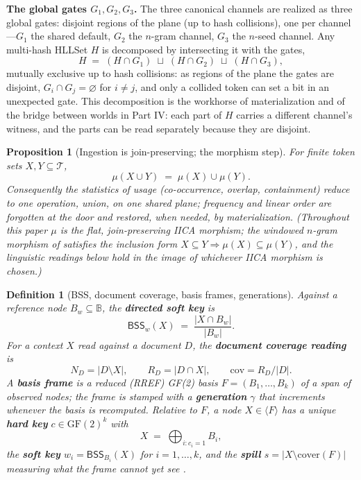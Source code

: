 \documentclass[11pt,a4paper]{article}
\newtheorem{definition}[principle]{Definition}
\newtheorem{proposition}[principle]{Proposition}
\theoremstyle{remark}
\newcommand{\Plane}{\ensuremath{\mathbb{B}}}            %
\newcommand{\Tok}{\ensuremath{\mathcal{T}}}              %
\newcommand{\BSS}{\ensuremath{\mathsf{BSS}}}             %
\newcommand{\spanof}[1]{\ensuremath{\langle #1\rangle}}  %
\newcommand{\Ing}{\ensuremath{\mu}}                      %
\newcommand{\Cov}{\ensuremath{\mathrm{cov}}}             %
\newcommand{\Gen}{\ensuremath{\gamma}}                   %
\newcommand{\cover}{\ensuremath{\mathrm{cover}}}         %
\begin{document}
\textbf{The global gates $G_1, G_2, G_3$.} The three canonical channels are
realized as three global gates: disjoint regions of the plane (up to hash
collisions), one per channel---$G_1$ the shared default, $G_2$ the $n$-gram
channel, $G_3$ the $n$-seed channel. Any multi-hash HLLSet $H$ is decomposed
by intersecting it with the gates,
\[
  H \;=\; (H \cap G_1) \;\sqcup\; (H \cap G_2) \;\sqcup\; (H \cap G_3),
\]
mutually exclusive up to hash collisions: as regions of the plane the gates
are disjoint, $G_i \cap G_j = \varnothing$ for $i \neq j$, and only a
collided token can set a bit in an unexpected gate. This decomposition is
the workhorse of materialization and of the bridge between worlds in
Part IV: each part of $H$ carries a different channel's witness, and the
parts can be read separately because they are disjoint.

\begin{proposition}[Ingestion is join-preserving; the morphism step]
\label{prop:join}
For finite token sets $X,Y \subseteq \Tok$,
\[
  \Ing(X \cup Y) \;=\; \Ing(X) \cup \Ing(Y).
\]
Consequently the statistics of usage (co-occurrence, overlap, containment)
reduce to one operation, union, on one shared plane; frequency and linear order
are forgotten at the door and restored, when needed, by materialization.
(Throughout this paper $\Ing$ is the flat, join-preserving IICA morphism;
the windowed $n$-gram morphism of \cite{state2026} satisfies the inclusion
form $X \subseteq Y \Rightarrow \Ing(X) \subseteq \Ing(Y)$, and the
linguistic readings below hold in the image of whichever IICA morphism is
chosen.)
\end{proposition}

\begin{definition}[BSS, document coverage, basis frames, generations]
\label{def:frame}
Against a reference node $B_w \subseteq \Plane$, the \textbf{directed soft key}
is
\[
  \BSS_w(X) \;=\; \frac{|X \cap B_w|}{|B_w|}.
\]
For a context $X$ read against a document $D$, the \textbf{document coverage
reading} is
\[
  N_D = |D \setminus X|, \qquad R_D = |D \cap X|, \qquad \Cov = R_D/|D|.
\]
A \textbf{basis frame} is a reduced (RREF) GF(2) basis $F = (B_1,\dots,B_k)$ of
a span of observed nodes; the frame is stamped with a \textbf{generation}
$\Gen$ that increments whenever the basis is recomputed. Relative to $F$, a
node $X \in \spanof{F}$ has a unique \textbf{hard key} $c \in
\mathrm{GF}(2)^k$ with
\[
  X \;=\; \bigoplus_{i : c_i = 1} B_i,
\]
the \textbf{soft key} $w_i = \BSS_{B_i}(X)$ for $i=1,\dots,k$, and the
\textbf{spill} $s = |X \setminus \cover(F)|$ measuring what the frame cannot
yet see \cite{state2026}.
\end{definition}
\end{document}
